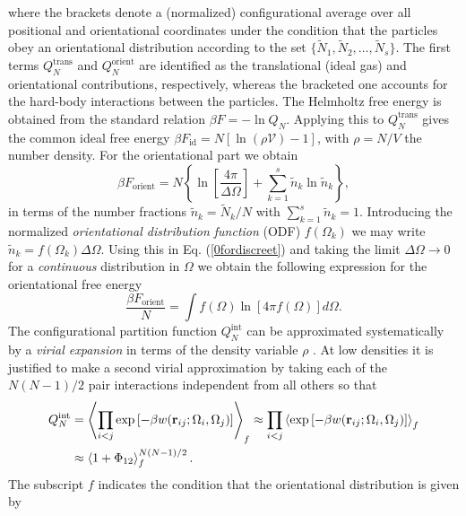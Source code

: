 \documentclass[amssymb]{revtex4}
\newcommand{\bfr}{{\bf r}}
\begin{document}
where the brackets denote a (normalized) configurational average over all positional and orientational 
coordinates under the condition that the particles obey an orientational distribution 
according to the set $\{\tilde{N}_{1},\tilde{N}_{2},\ldots,\tilde{N}_{s}\}$.
The first terms $Q_{N}^{\text{trans}}$ and $Q_{N}^{\text{orient}}$ are  identified as the translational (ideal gas) and
orientational contributions, respectively, whereas the bracketed one accounts for the hard-body interactions between 
the particles.
The Helmholtz free energy is obtained from the standard relation $\beta F= -\ln Q_{N}$. 
Applying this to $Q_{N}^{\text{trans}}$ gives the common ideal free energy
$\beta F_{\text{id}}= N\left[\ln (\rho \mathcal{V})-1\right]$, with $\rho=N/V$ the number density.
For the orientational part we obtain
\begin{equation}
\beta F_{\text{orient}}=N\left\{\ln \left[\frac{4\pi}{\Delta \Omega}\right] + \sum_{k=1}^{s}\tilde{n}_{k}\ln \tilde{n}_{k} \right\},
\label{0fordiscreet} 
\end{equation}
in terms of the number fractions $\tilde{n}_{k}=\tilde{N}_{k}/N$ with $\sum_{k=1}^{s}\tilde{n}_{k}=1$. 
Introducing the normalized {\em orientational distribution function} (ODF) $f(\Omega_{k})$ we may
write $\tilde{n}_{k}=f(\Omega_{k})\Delta\Omega$. Using this in Eq. (\ref{0fordiscreet}) and
taking the  limit $\Delta \Omega \rightarrow 0$ for a {\em continuous} distribution in $\Omega$ we 
obtain the following expression for the orientational free  energy
\begin{equation}
\frac{\beta F_{\text{orient}}}{N}=\int f(\Omega)\ln \left[4\pi f(\Omega)\right]d\Omega.
\label{0forient}
\end{equation}
The configurational partition function  $Q_{N}^{\text{int}}$ can be approximated
systematically by a {\em virial expansion} in terms of the density variable $\rho$ \cite{hansenmacdonald}. 
At low densities it is justified to make a second virial approximation   by taking each of the $N(N-1)/2$ pair interactions independent from all others
so that
\begin{align}
Q_{N}^{\text{int}}&= \left \langle \prod _{i<j}   
\exp\left[-\beta w(\bfr _{ij}; \Omega_{i}, \Omega_{j})\right]  \right \rangle _{f}
\approx \prod _{i<j}   
\left < \exp\left[-\beta w(\bfr _{ij}; \Omega_{i}, \Omega_{j})\right]  \right>_{f} \nonumber \\
&\approx\left<1+\Phi_{12}\right>_{f} ^{N(N-1)/2}. \label{0secondvir}
\end{align}
The subscript $f$ indicates the condition that the orientational distribution is given by 
\end{document}
